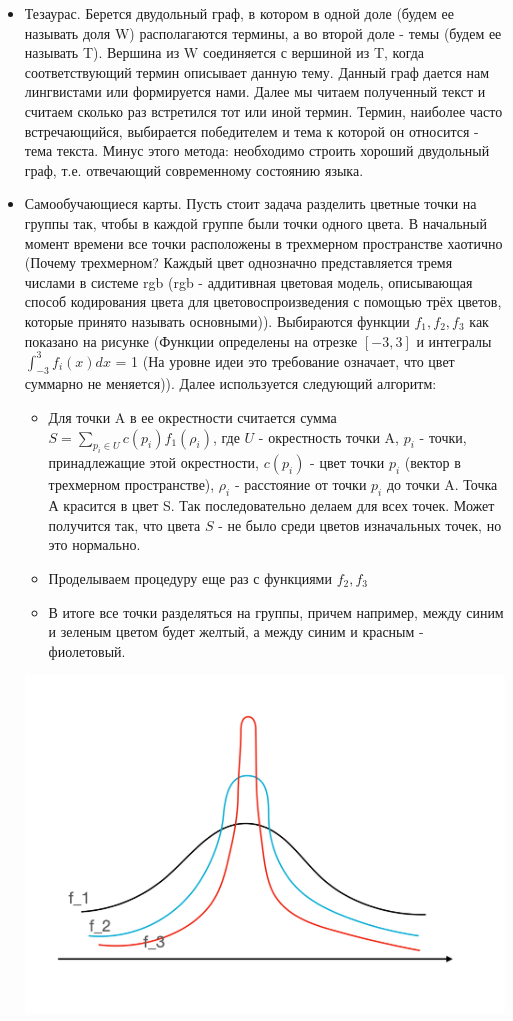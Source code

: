 \begin {itemize}
\item Тезаурас. Берется двудольный граф, в котором в одной доле (будем ее называть доля  W) располагаются термины, а во второй доле - темы (будем ее называть T). Вершина из W соединяется с вершиной из T, когда соответствующий термин описывает данную тему. Данный граф дается нам лингвистами или формируется нами. Далее мы читаем полученный текст и считаем сколько раз встретился тот или иной термин. Термин, наиболее часто встречающийся, выбирается победителем и тема к которой он относится - тема текста. Минус этого метода: необходимо строить хороший двудольный граф, т.е. отвечающий современному состоянию языка.
\item Самообучающиеся карты.
Пусть стоит задача разделить цветные точки на группы так, чтобы в каждой группе были точки одного цвета. В начальный момент времени все точки расположены в трехмерном пространстве хаотично (Почему трехмерном? Каждый цвет однозначно представляется тремя числами в системе rgb (rgb - аддитивная цветовая модель, описывающая способ кодирования цвета для цветовоспроизведения с помощью трёх цветов, которые принято называть основными)). Выбираются функции $f_1, f_2, f_3$ как показано на рисунке (Функции определены на отрезке $[-3, 3]$ и интегралы $\int_{-3}^3 f_i (x) dx$ = 1 (На уровне идеи это требование означает, что цвет суммарно не меняется)).
Далее используется следующий алгоритм:
\begin {itemize}
\item Для точки A в ее окрестности считается сумма $S = \sum_{p_i \in U} c (p_i) f_1 (\rho_i)$, где $U$ - окрестность точки A, $p_i$ - точки, принадлежащие этой окрестности, $c (p_i)$ - цвет точки $p_i$ (вектор в трехмерном пространстве), $\rho_i$ - расстояние от точки $p_i$ до точки A. Точка А красится в цвет S. Так последовательно делаем для всех точек. Может получится так, что цвета $S$ - не было среди цветов изначальных точек, но это нормально.
\item Проделываем процедуру еще раз с функциями $f_2, f_3$
\item В итоге все точки разделяться на группы, причем например, между синим и зеленым цветом будет желтый, а между синим и красным - фиолетовый.
\end {itemize}

\includegraphics[width=0.5\linewidth]{13/func}


\end{itemize}
